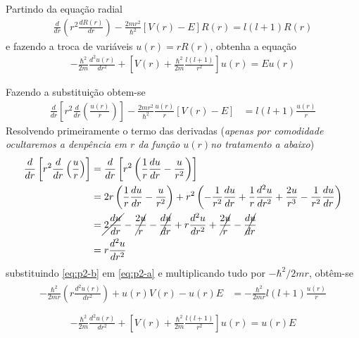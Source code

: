  \begin{prob}
	 Partindo da equação radial
	 \begin{align}
		 \frac{d}{dr}\left(r^{2}\frac{dR(r)}{dr}\right)-\frac{2mr^{2}}{\hbar^{2}}\left[V(r)-E\right]R(r)=l\left(l+1\right)R(r)
	 \end{align}
	 e fazendo a troca de variáveis $u(r)=rR(r)$, obtenha a equação
	 \begin{align}
		 -\frac{\hbar^{2}}{2m}\frac{d^{2}u(r)}{dr^{2}}+\left[V(r)+\frac{\hbar^{2}}{2m}\frac{l\left(l+1\right)}{r^{2}} \right]u(r)=Eu(r)
	 \end{align}
	 \begin{sol}
		 Fazendo a substituição obtem-se
		 \begin{align}
			 \label{eq:p2-a}
			 \frac{d}{dr}\left[r^{2}\frac{d}{dr}\left(\frac{u(r)}{r}\right)\right]-\frac{2mr^{2}}{\hbar^{2}}\frac{u(r)}{r}\left[V(r)-E\right] &= l \left(l+1\right)\frac{u(r)}{r}
		 \end{align}
		 Resolvendo primeiramente o termo das derivadas (\textit{apenas por comodidade ocultaremos a denpência em $r$ da função $u(r)$no tratamento a abaixo})
		 \begin{align}
			 \label{eq:p2-b}
			 \begin{split}
				 \frac{d}{dr}\left[r^{2}\frac{d}{dr}\left(\frac{u}{r}\right)\right] &= \frac{d}{dr}\left[r^{2}\left(\frac{1}{r}\frac{du}{dr}-\frac{u}{r^{2}}\right)\right]\\
																																						&= 2r \left(\frac{1}{r}\frac{du}{dr}-\frac{u}{r^{2}}\right)+r^{2}\left(-\frac{1}{r^{2}}\frac{du}{dr}+\frac{1}{r}\frac{d^{2}u}{dr^{2}}+\frac{2u}{r^{3}}-\frac{1}{r^{2}}\frac{du}{dr}\right) \\
																																						&= \cancel{2\frac{du}{dr}}-\cancel{\frac{2u}{r}}-\cancel{\frac{du}{dr}}+r \frac{d^{2}u}{dr^{2}}+\cancel{\frac{2u}{r}}-\cancel{\frac{du}{dr}}\\
																																						&= r \frac{d^{2}u}{dr^{2}}
			 \end{split}
		 \end{align}
		 substituindo \eqref{eq:p2-b} em \eqref{eq:p2-a} e multiplicando tudo por $-\hbar^{2}/2mr$, obtêm-se
		 \begin{align}
			 \begin{split}
				 -\frac{\hbar^{2}}{2mr}\left(r\frac{d^{2}u(r)}{dr^{2}}\right)+u(r)V(r)-u(r)E &=-\frac{\hbar^{2}}{2mr} l \left(l+1\right)\frac{u(r)}{r}\\
			 \end{split}
		 \end{align}
		 \begin{align}
			 \boxed{
				 -\frac{\hbar^{2}}{2m}\frac{d^{2}u(r)}{dr^{2}}+\left[V(r)+\frac{\hbar^{2}}{2m}\frac{l\left(l+1\right)}{r^{2}}\right]u(r)=u(r)E
			 }
		 \end{align}
	 \end{sol}
 \end{prob}

